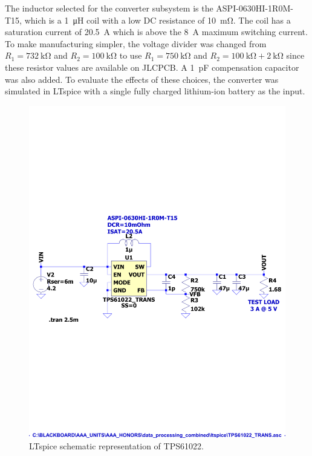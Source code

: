 \documentclass{report}
\begin{document}
The inductor selected for the converter subsystem is the ASPI-0630HI-1R0M-T15, which is a \SI{1}{\micro\henry} coil with a low DC resistance of \SI{10}{\milli\ohm}. The coil has a saturation current of \SI{20.5}{\ampere} which is above the \SI{8}{\ampere} maximum switching current. To make manufacturing simpler, the voltage divider was changed from $R_1=\SI{732}{\kilo\ohm}$ and $R_2=\SI{100}{\kilo\ohm}$ to use $R_1=\SI{750}{\kilo\ohm}$ and $R_2=\SI{100}{\kilo\ohm}+\SI{2}{\kilo\ohm}$ since these resistor values are available on JLCPCB.  A \SI{1}{\pico\farad} compensation capacitor was also added. To evaluate the effects of these choices, the converter was simulated in LTspice with a single fully charged lithium-ion battery as the input.

\begin{figure}[H]
  \centering
  \includegraphics[trim=0 8.5cm 0 8cm, clip, width=\linewidth]{images/TPS61022-simulation.pdf}
  \caption{LTspice schematic representation of TPS61022.}
  \label{fig:TPS61022-schematic-ltspice}
\end{figure}
\end{document}
